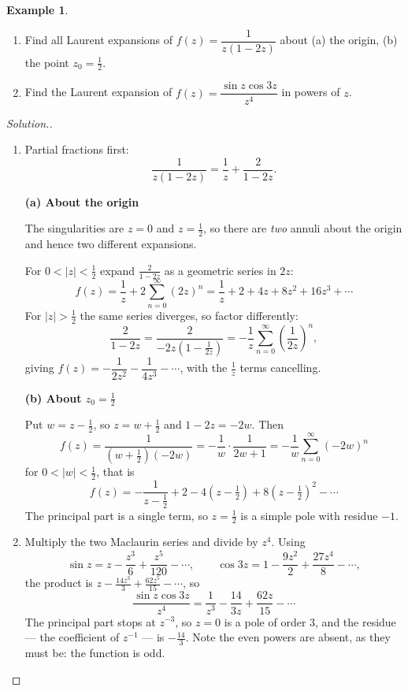 \documentclass[11pt,a4paper]{article}
\theoremstyle{definition}
\newtheorem{example}[thm]{Example}
\newenvironment{solution}
  {\renewcommand{\qedsymbol}{}\begin{proof}[\textit{Solution}.]}
  {\end{proof}}
\newcommand{\subhead}[1]{%
  \par\medskip\noindent\textbf{#1}\par\nobreak\smallskip}
\begin{document}
\begin{example}
\begin{enumerate}
\item Find all Laurent expansions of $f(z) = \dfrac{1}{z (1 - 2z)}$ about
(a) the origin, (b) the point $z_0 = \frac{1}{2}$.
\item Find the Laurent expansion of $f(z) = \dfrac{\sin z \cos 3z}{z^4}$ in
powers of $z$.
\end{enumerate}
\end{example}
\begin{solution}
\begin{enumerate}
\item Partial fractions first:
$$\frac{1}{z(1-2z)}=\frac{1}{z}+\frac{2}{1-2z}.$$

\subhead{(a) About the origin}
The singularities are $z=0$ and $z=\frac12$, so there are \emph{two} annuli
about the origin and hence two different expansions.

For $0<\left|z\right|<\frac12$ expand $\frac{2}{1-2z}$ as a geometric series in
$2z$:
$$f(z)=\frac{1}{z}+2\sum_{n=0}^{\infty}(2z)^n
=\frac{1}{z}+2+4z+8z^2+16z^3+\cdots$$
For $\left|z\right|>\frac12$ the same series diverges, so factor differently:
$$\frac{2}{1-2z}=\frac{2}{-2z\left(1-\frac{1}{2z}\right)}
=-\frac{1}{z}\sum_{n=0}^{\infty}\left(\frac{1}{2z}\right)^n,$$
giving $f(z)=-\dfrac{1}{2z^2}-\dfrac{1}{4z^3}-\cdots$, with the $\frac1z$ terms
cancelling.

\subhead{(b) About $z_0=\frac12$}
Put $w=z-\frac12$, so $z=w+\frac12$ and $1-2z=-2w$. Then
$$f(z)=\frac{1}{\left(w+\frac12\right)(-2w)}=-\frac{1}{w}\cdot\frac{1}{2w+1}
=-\frac{1}{w}\sum_{n=0}^{\infty}(-2w)^n$$
for $0<\left|w\right|<\frac12$, that is
$$f(z)=-\frac{1}{z-\frac12}+2-4\left(z-\tfrac12\right)
+8\left(z-\tfrac12\right)^2-\cdots$$
The principal part is a single term, so $z=\frac12$ is a simple pole with
residue $-1$.

\item Multiply the two Maclaurin series and divide by $z^4$. Using
$$\sin z=z-\frac{z^3}{6}+\frac{z^5}{120}-\cdots,\qquad
\cos 3z=1-\frac{9z^2}{2}+\frac{27z^4}{8}-\cdots,$$
the product is $z-\frac{14z^3}{3}+\frac{62z^5}{15}-\cdots$, so
$$\frac{\sin z\cos 3z}{z^4}=\frac{1}{z^3}-\frac{14}{3z}+\frac{62z}{15}-\cdots$$
The principal part stops at $z^{-3}$, so $z=0$ is a pole of order $3$, and the
residue --- the coefficient of $z^{-1}$ --- is $-\frac{14}{3}$. Note the even
powers are absent, as they must be: the function is odd.
\end{enumerate}
\end{solution}
\end{document}
